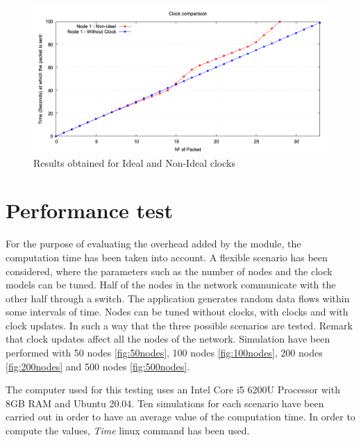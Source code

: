 \documentclass[times, twoside, watermark]{zHenriquesLab-StyleBioRxiv}
\begin{document}
\begin{figure}[h]
    \centering
    \includegraphics[width=\linewidth]{Figures/Validation2Nodes.png}
    \caption{Results obtained for Ideal and Non-Ideal clocks}
    \label{fig:ValidationGraph}
\end{figure}

\section*{Performance test}
For the purpose of evaluating the overhead added by the module, the computation time has been taken into account. A flexible scenario has been considered, where the parameters such as the number of nodes and the clock models can be tuned.  
Half of the nodes in the network communicate with the other half through a switch. The application generates random data flows within some intervals of time. Nodes can be tuned without clocks, with clocks and with clock updates. In such a way that the three possible scenarios are tested. Remark that clock updates affect all the nodes of the network. 
Simulation have been performed with 50 nodes  \ref{fig:50nodes}, 100 nodes \ref{fig:100nodes}, 200 nodes \ref{fig:200nodes} and 500 nodes \ref{fig:500nodes}.

The computer used for this testing uses an Intel Core i5 6200U Processor with 8GB RAM and Ubuntu 20.04. Ten simulations for each scenario have been carried out in order to have an average value of the computation time. In order to compute the values, \textit{Time} linux command has been used. 
\end{document}
